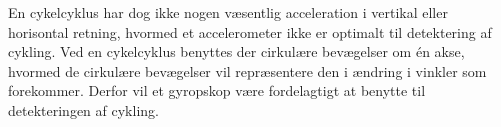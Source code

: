 En cykelcyklus har dog ikke nogen væsentlig acceleration i vertikal eller horisontal retning, hvormed et accelerometer ikke er optimalt til detektering af cykling. Ved en cykelcyklus benyttes der cirkulære bevægelser om én akse, hvormed de cirkulære bevægelser vil repræsentere den i ændring i vinkler som forekommer. Derfor vil et gyropskop være fordelagtigt at benytte til detekteringen af cykling.  \citep{Cockcroft2011,Marin-PerianuMarin-Perianu2013}


%
%
%
